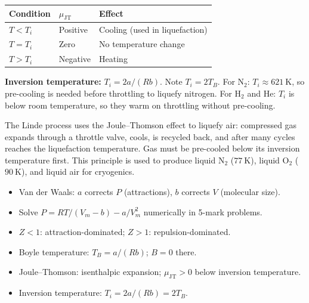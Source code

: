 \documentclass[12pt,a4paper]{article}
\begin{document}
\begin{tabularx}{\linewidth}{|B{3.0cm}|Y|Y|}
\hline
\textbf{Condition} & \textbf{$\mu_{\mathrm{JT}}$} & \textbf{Effect} \\
\hline
$T < T_i$ & Positive & Cooling (used in liquefaction) \\
\hline
$T = T_i$ & Zero & No temperature change \\
\hline
$T > T_i$ & Negative & Heating \\
\hline
\end{tabularx}

\textbf{Inversion temperature:} $T_i = 2a/(Rb)$. Note $T_i = 2T_B$. For $\mathrm{N_2}$: $T_i\approx 621\ \mathrm{K}$, so pre-cooling is needed before throttling to liquefy nitrogen. For $\mathrm{H_2}$ and $\mathrm{He}$: $T_i$ is below room temperature, so they warm on throttling without pre-cooling.

\begin{tcolorbox}[masonbox, title={Linde Liquefaction Process and Joule--Thomson Effect}]
The Linde process uses the Joule--Thomson effect to liquefy air: compressed gas expands through a throttle valve, cools, is recycled back, and after many cycles reaches the liquefaction temperature. Gas must be pre-cooled below its inversion temperature first. This principle is used to produce liquid $\mathrm{N_2}$ ($77\ \mathrm{K}$), liquid $\mathrm{O_2}$ ($90\ \mathrm{K}$), and liquid air for cryogenics.
\end{tcolorbox}

\begin{tcolorbox}[exambox, title={Exam Points (Section 3)}]
\begin{itemize}[leftmargin=*, itemsep=2pt, topsep=2pt]
  \item Van der Waals: $a$ corrects $P$ (attractions), $b$ corrects $V$ (molecular size).
  \item Solve $P = RT/(V_m-b) - a/V_m^2$ numerically in 5-mark problems.
  \item $Z < 1$: attraction-dominated; $Z > 1$: repulsion-dominated.
  \item Boyle temperature: $T_B = a/(Rb)$; $B = 0$ there.
  \item Joule--Thomson: isenthalpic expansion; $\mu_{\mathrm{JT}} > 0$ below inversion temperature.
  \item Inversion temperature: $T_i = 2a/(Rb) = 2T_B$.
\end{itemize}
\end{tcolorbox}

\end{document}
